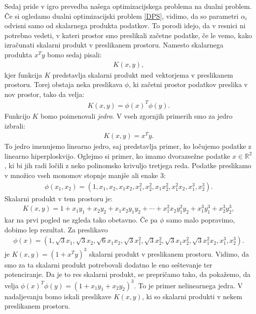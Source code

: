 \documentclass[mat1]{fmfdelo}
\newcommand{\R}{\mathbb R}
\begin{document}
Sedaj pride v igro prevedba našega optimizacijskega problema na dualni problem. Če si ogledamo dualni optimizacijski problem \eqref{DPS}, vidimo, da so parametri $\alpha_i$ odvisni samo od skalarnega produkta podatkov. To porodi idejo, da v resnici ni potrebno vedeti, v kateri prostor smo preslikali začetne podatke, če le vemo, kako izračunati skalarni produkt v preslikanem prostoru. Namesto skalarnega produkta $x^Ty$ bomo sedaj pisali: 
\begin{align*}
K(x, y),
\end{align*}
kjer funkcija $K$ predstavlja skalarni produkt med vektorjema v preslikanem prostoru. Torej obstaja neka preslikava $\phi$, ki začetni prostor podatkov preslika v nov prostor, tako da velja:
\begin{align*}
K(x, y) = \phi(x)^T\phi(y) .
\end{align*} 
Funkcijo $K$ bomo poimenovali \emph{jedro}. V vseh zgornjih primerih smo za jedro izbrali:
\begin{align*}
K(x, y) = x^Ty.
\end{align*}
To jedro imenujemo linearno jedro, saj predstavlja primer, ko ločujemo podatke z linearno hiperploskvijo. Oglejmo si primer, ko imamo dvorazsežne podatke $x\in \R^2$, ki bi jih radi ločili z neko polinomsko krivuljo tretjega reda. Podatke preslikamo v množico vseh monomov stopnje manjše ali enake 3:
\begin{align*}
	\phi(x_1, x_2) = (1, x_1, x_2, x_1x_2, x_1^2, x_2^2, x_1x_2^2, x_1^2x_2, x_1^3, x_2^3). 
\end{align*}
Skalarni produkt v tem prostoru je: 
\begin{align*}
	K(x, y) = 1 +  x_1y_1+ x_2y_2+ x_1x_2y_1y_2+ \cdots+ x_1^2x_2y_1^2y_2+ x_1^3y_1^3+ x_2^3y_2^3,
\end{align*}
kar na prvi pogled ne zgleda tako obetavno. Če pa $\phi$ samo malo popravimo, dobimo lep rezultat. Za preslikavo
\begin{align*}
	\phi(x) = (1, \sqrt{3}x_1, \sqrt{3}x_2, \sqrt{6}x_1x_2, \sqrt{3}x_1^2, \sqrt{3}x_2^2, \sqrt{3}x_1x_2^2, \sqrt{3}x_1^2x_2, x_1^3, x_2^3). 
\end{align*}
je $K(x, y) = (1 + x^Ty)^3$ skalarni produkt v preslikanem prostoru. Vidimo, da smo za ta skalarni produkt potrebovali dodatno le eno seštevanje ter potenciranje. Da je to res skalarni produkt, se prepričamo tako, da pokažemo, da velja $\phi(x)^T\phi(y) = (1+x_1y_1 + x_2y_2)^3.$ To je primer nelinearnega jedra. V nadaljevanju bomo iskali preslikave $K(x, y)$, ki so skalarni produkti v nekem preslikanem prostoru. 
\end{document}
